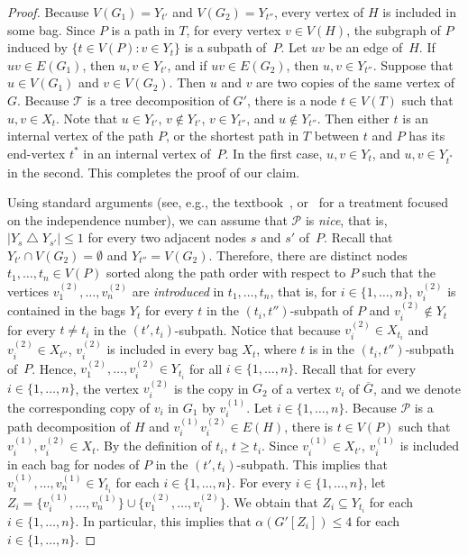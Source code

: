 \documentclass[11pt]{article}
\theoremstyle{definition}
\begin{document}
\begin{proof}
Because $V(G_1)=Y_{t'}$ and $V(G_2)=Y_{t''}$, every vertex of $H$ is included in some bag. Since $P$ is a path in $T$, for every vertex $v\in V(H)$, the subgraph of $P$ induced by $\{t\in V(P)\colon v\in Y_t\}$ is a subpath of~$P$. Let $uv$ be an edge of~$H$. If $uv\in E(G_1)$, then $u,v\in Y_{t'}$, and if $uv\in E(G_2)$, then $u,v\in Y_{t''}$. Suppose that $u\in V(G_1)$ and $v\in V(G_2)$. Then $u$ and $v$ are two copies of the same vertex of~$G$. Because $\mathcal{T}$ is a tree decomposition of $G'$, there is a node $t\in V(T)$  such that $u,v\in X_t$.
Note that $u\in Y_{t'}$, $v\notin Y_{t'}$, $v\in Y_{t''}$, and $u\notin Y_{t''}$.
Then either $t$ is an internal vertex of the path $P$, or the shortest path in $T$ between $t$ and $P$ has its end-vertex $t^*$ in an internal vertex of~$P$.
In the first case, $u,v\in Y_t$, and $u,v\in Y_{t^*}$ in the second.
This completes the proof of our claim.

Using standard arguments (see, e.g., the textbook~\cite{cygan2015parameterized}, or~\cite{DallardMS24} for a treatment focused on the independence number), we can assume that $\mathcal{P}$ is \emph{nice}, that is, $|Y_{s}\bigtriangleup Y_{s'}|\leq 1$ for every two adjacent nodes $s$ and $s'$ of~$P$.
Recall that $Y_{t'}\cap V(G_2)=\emptyset$ and $Y_{t''}=V(G_2)$.
Therefore, there are distinct nodes $t_1,\ldots,t_n\in V(P)$ sorted along the path order with respect to $P$ such that the vertices $v_1^{(2)},\ldots,v_n^{(2)}$ are \emph{introduced} in $t_1,\ldots,t_n$, that is, for $i\in \{1,\ldots,n\}$, $v_i^{(2)}$ is contained in the bags $Y_t$ for every $t$ in the $(t_i,t'')$-subpath of $P$ and $v_i^{(2)}\notin Y_t$ for every $t\neq t_i$ in the $(t',t_i)$-subpath.
Notice that because $v_i^{(2)}\in X_{t_i}$ and $v_i^{(2)}\in X_{t''}$, $v_i^{(2)}$ is included in every bag $X_t$, where  $t$ is in the $(t_i,t'')$-subpath of~$P$.
Hence, $v_1^{(2)},\ldots,v_i^{(2)}\in Y_{t_i}$ for all $i\in\{1,\ldots,n\}$.
Recall that for every $i\in\{1,\ldots,n\}$, the vertex  $v_i^{(2)}$ is the copy in $G_2$ of a vertex $v_i$ of $\overline{G}$, and we denote the corresponding copy of $v_i$ in $G_1$ by $v_i^{(1)}$.
Let $i\in\{1,\ldots,n\}$.
Because $\mathcal{P}$ is a path decomposition of $H$ and $v_i^{(1)}v_i^{(2)}\in E(H)$, there is $t\in V(P)$ such that $v_i^{(1)},v_i^{(2)}\in X_t$. By the definition of $t_i$, $t\geq t_i$. Since $v_i^{(1)}\in X_{t'}$, $v_i^{(1)}$ is included in each bag for nodes of $P$ in the $(t',t_i)$-subpath.
This implies that $v_i^{(1)},\ldots,v_n^{(1)}\in Y_{t_i}$ for each $i\in\{1,\ldots,n\}$.
For every $i\in\{1,\ldots,n\}$, let $Z_i=\{v_i^{(1)},\ldots,v_n^{(1)}\}\cup\{v_1^{(2)},\ldots,v_i^{(2)}\}$.
We obtain that $Z_i\subseteq Y_{t_i}$ for each $i\in\{1,\ldots,n\}$.
In particular, this implies that
$\alpha(G'[Z_i])\leq 4$ for each $i\in\{1,\ldots,n\}$.


\end{proof}
\end{document}
